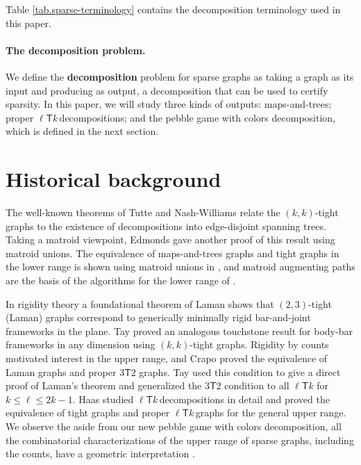 \documentclass[11pt]{article}
\newcommand{\ellteekay}{\ensuremath{\ell{\mathsf T}k}\,}
\begin{document}
	Table \ref{tab.sparse-terminology} contains the decomposition terminology used in this paper.
	
	\paragraph{The decomposition problem.} 
	We define the {\bf decomposition} problem for sparse graphs as taking a graph as
	its input and producing as output, a decomposition that can be used to certify 
	sparsity.  In this paper, we will study three kinds of outputs: maps-and-trees; 
	proper \ellteekay decompositions; and the pebble game with colors decomposition, 
	which is defined in the next section.
	


\section{Historical background}
The well-known theorems of Tutte \cite{tutte61} and Nash-Williams \cite{Na61} relate 
the $(k,k)$-tight graphs to the existence of decompositions into edge-disjoint 
spanning trees.  Taking a matroid viewpoint, Edmonds \cite{Ed65,DBLP:conf/aussois/Edmonds01} 
gave another proof of this result using matroid unions.  The equivalence of 
maps-and-trees graphs and tight graphs in the lower range is shown using matroid 
unions in \cite{whiteley:union-matroids}, and matroid augmenting paths are the 
basis of the algorithms for the lower range of \cite{RoTa85,gabow1995,GaWe88}.

In rigidity theory a foundational theorem of Laman \cite{laman70} shows that  
$(2,3)$-tight (Laman) graphs correspond to generically minimally rigid bar-and-joint 
frameworks in the plane.  Tay \cite{Ta1,Ta2} proved an analogous touchstone 
result for body-bar frameworks in any dimension using $(k,k)$-tight graphs.  Rigidity by counts
motivated interest 
in the upper range, and Crapo \cite{Cr96} proved the equivalence of Laman
graphs and proper $3\mathsf{T}2$ graphs.  Tay \cite{Tay93} used this condition 
to give a direct proof of Laman's theorem and generalized the $3\mathsf{T}2$ condition
to all $\ell\mathsf{T}k$ for $k\le \ell\le 2k-1$.  Haas \cite{haas:2002} studied 
\ellteekay decompositions in detail and proved the equivalence of tight graphs and 
proper \ellteekay graphs for the general upper range.  We observe the aside 
from our new pebble game with colors decomposition, all the combinatorial 
characterizations of the upper range of sparse graphs, including the counts,
have a geometric interpretation 
\cite{whiteley:union-matroids,laman70,Tay93,Ta1,Ta2}.
\end{document}
